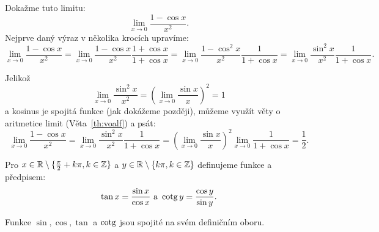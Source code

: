 \begin{remark}
    Dokažme tuto limitu:
    $$\lim_{x \to 0} \frac{1 - \cos x}{x^2}.$$
    Nejprve daný výraz v několika krocích upravíme:
    $$\lim_{x \to 0} \frac{1 - \cos x}{x^2} = \lim_{x \to 0}\frac{1 - \cos x}{x^2}
    \frac{1 + \cos x}{1 + \cos x} = \lim_{x \to 0} \frac{1 - \cos^2 x}{x^2}
    \frac{1}{1 + \cos x} = \lim_{x \to 0} \frac{\sin^2 x}{x^2} \frac{1}{1 + \cos x}.$$

    Jelikož
    $$\lim_{x \to 0} \frac{\sin^2 x}{x^2} = \left(\lim_{x\to 0} 
    \frac{\sin x}{x}\right)^2 = 1$$
    a kosinus je spojitá funkce (jak dokážeme později), můžeme využít věty o
    aritmetice limit (Věta~\ref{th:voalf}) a psát:
    $$\lim_{x \to 0} \frac{1 - \cos x}{x^2} = 
    \lim_{x \to 0} \frac{\sin^2 x}{x^2} \frac{1}{1 + \cos x}
    = \left(\lim_{x\to 0}  \frac{\sin x}{x}\right)^2 \lim_{x \to 0}
    \frac{1}{1 + \cos x} = \frac{1}{2}.$$
\end{remark}

\begin{definition}
    Pro $x \in \mathbb{R} \setminus \{\frac{\pi}{2} + k\pi, k \in \mathbb{Z}\}$ a
    $y \in \mathbb{R} \setminus \{k\pi, k \in \mathbb{Z}\}$ definujeme funkce 
    a  předpisem:
    $$\tan x = \frac{\sin x}{\cos x} \text{ a } \operatorname{cotg} y = \frac{\cos y}{\sin y}.$$
\end{definition}

\begin{theorem}
    Funkce $\sin, \cos, \tan$ a $\operatorname{cotg}$ jsou spojité na svém definičním oboru.
\end{theorem}

